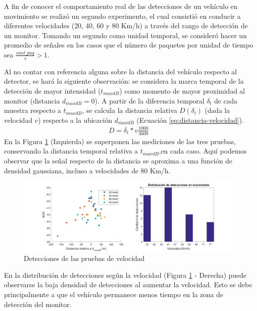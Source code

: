 A fin de conocer el comportamiento real de las detecciones de un vehículo en movimiento se realizó un segundo experimento, el cual consistió en conducir a diferentes velocidades (20, 40, 60 y 80 Km/h) a través del rango de detección de un monitor. Tomando un segundo como unidad temporal, se consideró hacer un promedio de señales en los casos que el número de paquetes por unidad de tiempo sea $\frac{cant\_paq}{s}>1$.

Al no contar con referencia alguna sobre la distancia del vehículo respecto al detector, se hará la siguiente observación: se considera la marca temporal de la detección de mayor intensidad ($t_{maxdB}$) como momento de mayor proximidad al monitor (distancia $d_{maxdB}=0$).
A partir de la diferencia temporal $\delta_t$ de cada muestra respecto a $t_{maxdB}$, se calcula la distancia relativa $D(\delta_t)$ (dada la velocidad $v$) respecto a la ubicación $d_{maxdB}$ (Ecuación \ref{eq:distancia-velocidad}).
\begin{align}\label{eq:distancia-velocidad}
    D = \delta_t * v \frac{1000}{3600} 
\end{align}
En la Figura \ref{fig:speedtest} (Izquierda) se superponen las mediciones de las tres pruebas, conservando la distancia temporal relativa a $t_{maxdB}$,en cada caso. Aquí podemos observar que la señal respecto de la distancia se aproxima a una función de densidad gaussiana, incluso a velocidades de 80 Km/h.

\begin{figure}[!htp]
	\centering
	\includegraphics[width=\textwidth]{images/speedtest.png}
	\caption{Detecciones de las pruebas de velocidad}
    \label{fig:speedtest}
\end{figure}

En la distribución de detecciones según la velocidad (Figura \ref{fig:speedtest} - Derecha) puede observarse la baja densidad de detecciones al aumentar la velocidad. Esto se debe principalmente a que el vehículo permanece menos tiempo en la zona de detección del monitor. 


